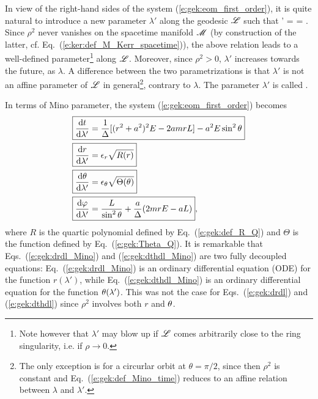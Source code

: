 In view of the right-hand sides of the system (\ref{e:gek:eom_first_order}),
it is quite natural to introduce a new
parameter $\lambda'$
along the geodesic $\mathscr{L}$ such that
\be \label{e:gek:def_Mino_time}
    \D\lambda' = 
     =  .
\ee
Since $\rho^2$ never vanishes on the spacetime manifold $\mathscr{M}$ (by construction
of the latter, cf. Eq.~(\ref{e:ker:def_M_Kerr_spacetime})), the above relation
leads to a well-defined parameter\footnote{Note however that $\lambda'$ may blow up
if $\mathscr{L}$ comes arbitrarily close to the ring singularity, i.e. if $\rho\to 0$.} along $\mathscr{L}$.
Moreover, since $\rho^2>0$, $\lambda'$
increases towards the future, as $\lambda$. A difference between
the two parametrizations is that $\lambda'$ is not an affine parameter
of $\mathscr{L}$ in general\footnote{The only
exception is for a circurlar orbit at $\theta=\pi/2$, since then $\rho^2$
is constant and Eq.~(\ref{e:gek:def_Mino_time}) reduces to an affine relation
between $\lambda$ and $\lambda'$.}, contrary to $\lambda$.
The parameter $\lambda'$ is called  \cite{Mino03}.

In terms of Mino parameter, the system (\ref{e:gek:eom_first_order}) becomes
\begin{subequations}
\label{e:gek:eom_Mino}
\begin{align}
& \fbox{$\displaystyle  \frac{\mathrm{d} t}{\mathrm{d} \lambda'} = \frac{1}{\Delta} [(r^2 + a^2)^2 E - 2a m r L] - a^2 E \sin^2\theta $} \label{e:gek:dtdl_Mino} \\
& \fbox{$\displaystyle  \frac{\mathrm{d} r}{\mathrm{d} \lambda'} = \epsilon_r \sqrt{ R(r) } $} \label{e:gek:drdl_Mino}\\
& \fbox{$\displaystyle  \frac{\mathrm{d} \theta}{\mathrm{d} \lambda'} = \epsilon_\theta \sqrt{\Theta(\theta)} $} \label{e:gek:dthdl_Mino}\\
& \fbox{$\displaystyle  \frac{\mathrm{d} \varphi}{\mathrm{d} \lambda'}  = \frac{L}{\sin^2\theta}
    + \frac{a}{\Delta}(2 m r E - a L) $} , \label{e:gek:dphdl_Mino}
\end{align}
\end{subequations}
where $R$ is the quartic polynomial defined by Eq.~(\ref{e:gek:def_R_Q})
and $\Theta$ is the function defined by Eq.~(\ref{e:gek:Theta_Q}).
It is remarkable that Eqs.~(\ref{e:gek:drdl_Mino}) and (\ref{e:gek:dthdl_Mino})
are two fully decoupled equations: Eq.~(\ref{e:gek:drdl_Mino}) is an ordinary
differential equation (ODE) for the function $r(\lambda')$, while Eq.~(\ref{e:gek:dthdl_Mino})
is an ordinary differential equation for the function $\theta(\lambda')$. This was
not the case for Eqs.~(\ref{e:gek:drdl}) and (\ref{e:gek:dthdl}) since $\rho^2$ involves
both $r$ and $\theta$.

